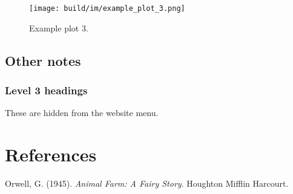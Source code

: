 \documentclass[
  14pt
  american,
  paper=a4,
  ,captions=tableheading
]{scrreprt}
\newlength{\cslhangindent}
\newenvironment{cslreferences}%
  {\setlength{\parindent}{0pt}%
  \everypar{\setlength{\hangindent}{\cslhangindent}}\ignorespaces}%
  {\par}
\begin{document}
\begin{figure}
\hypertarget{fig:example_plot_3}{%
\centering
\texttt{[image: build/im/example\_plot\_3.png]}
\caption{Example plot 3.}\label{fig:example_plot_3}
}
\end{figure}

\hypertarget{other-notes}{%
\section{Other notes}\label{other-notes}}

\hypertarget{level-3-headings}{%
\subsection{Level 3 headings}\label{level-3-headings}}

These are hidden from the website menu.

\hypertarget{references}{%
\chapter*{References}\label{references}}

\hypertarget{refs}{}
\begin{cslreferences}
\leavevmode\hypertarget{ref-orwell1945animal}{}%
Orwell, G. (1945). \emph{Animal Farm: A Fairy Story}. Houghton Mifflin
Harcourt.
\end{cslreferences}

\end{document}
